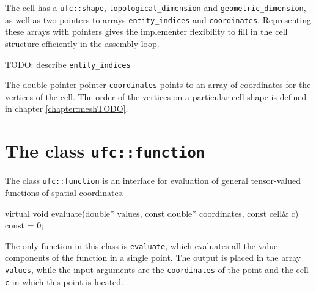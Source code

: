 
The cell has a \texttt{ufc::shape}, \texttt{topological\_dimension} and \texttt{geometric\_dimension},
as well as two pointers to arrays \texttt{entity\_indices} and \texttt{coordinates}.
Representing these arrays with pointers gives the implementer flexibility
to fill in the cell structure efficiently in the assembly loop.

TODO: describe 
\texttt{entity\_indices}

The double pointer pointer \texttt{coordinates} points to an array of coordinates for the vertices of the cell.
The order of the vertices on a particular cell shape is defined in chapter \ref{chapter:meshTODO}.


\section{The class \texttt{ufc::function}}







The class \texttt{ufc::function} is an interface for evaluation of
general tensor-valued functions of spatial coordinates.

\begin{code}
virtual void evaluate(double* values,
                      const double* coordinates,
                      const cell& c) const = 0;
\end{code}

The only function in this class is \texttt{evaluate},
which evaluates all the value components of the function in a single point.
The output is placed in the array \texttt{values},
while the input arguments are the \texttt{coordinates} of the point
and the cell \texttt{c} in which this point is located.

